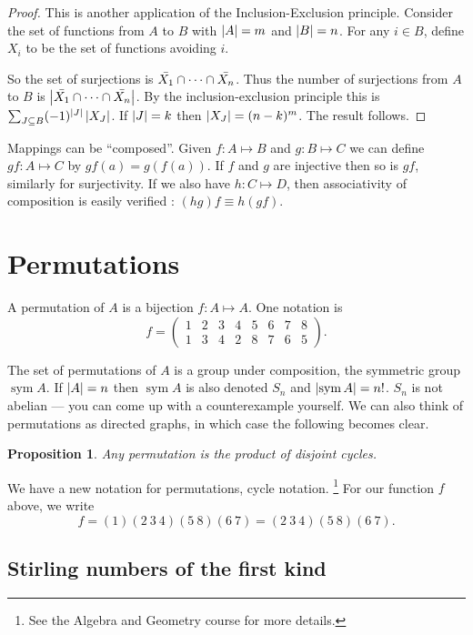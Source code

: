 \documentclass{notes}
\theoremstyle{plain}
\newtheorem*{proposition}{Proposition}
\DeclareMathOperator{\sym}{sym}
\begin{document}
\begin{proof}
This is another application of the Inclusion-Exclusion principle.  Consider
the set of functions from $A$ to $B$ with $\left|A\right| = m$ and
$\left|B\right| = n$. For any $i \in B$, define $X_i$ to be the set of functions
avoiding $i$.

So the set of surjections is $\Bar{X_1} \cap \dots \cap \Bar{X_n}$.
Thus the number of surjections from $A$ to $B$ is
$\left|\Bar{X_1} \cap \dots \cap \Bar{X_n}\right|$.  By the inclusion-exclusion
principle this is $\sum_{J \subseteq B} (-1)^{\left|J\right|} \left|X_J\right|$.
If $\left|J\right| = k$ then $\left|X_J\right| = (n-k)^m$.  The result follows.
\end{proof}

Mappings can be ``composed''.  Given $f \colon A \mapsto B$ and
$g \colon B \mapsto C$ we can define $gf \colon A \mapsto C$ by
$gf(a) = g(f(a))$.  If $f$ and $g$ are injective then so is $gf$, similarly
for surjectivity.  If we also have $h \colon C \mapsto D$, then associativity
of composition is easily verified : $(hg)f \equiv h(gf)$.

\section{Permutations}

A permutation of $A$ is a bijection $f \colon A \mapsto A$.  One notation
is
\[
f = \begin{pmatrix}
1 & 2 & 3 & 4 & 5 & 6 & 7 & 8 \\
1 & 3 & 4 & 2 & 8 & 7 & 6 & 5
\end{pmatrix}.
\]

The set of permutations of $A$ is a group under composition, the symmetric
group $\sym A$.  If $\left|A\right| = n$ then $\sym A$ is also denoted $S_n$ and
$\abs{\sym A} = n!$.  $S_n$ is not abelian --- you can come up with
a counterexample yourself. We can also think of permutations
as directed graphs, in which case the following becomes clear.

\begin{proposition}
Any permutation is the product of disjoint cycles.
\end{proposition}

We have a new notation for permutations, cycle notation.%
\footnote{See the Algebra and Geometry course for more details.}  For our
function $f$ above, we write
\[
f = (1) (2\ 3\ 4) (5\ 8) (6\ 7) = (2\ 3\ 4) (5\ 8) (6\ 7).
\]

\subsection{Stirling numbers of the first kind}
\end{document}
